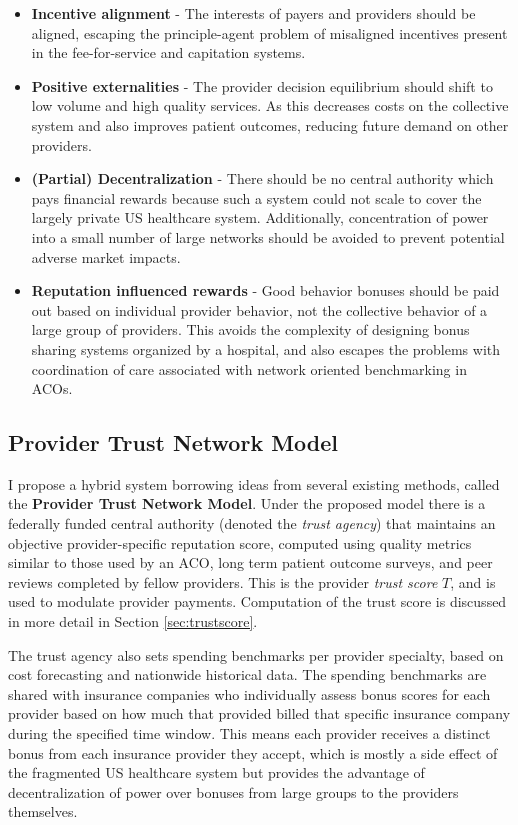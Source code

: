 \documentclass{article}
\begin{document}
\begin{itemize}
    \item \textbf{Incentive alignment} - The interests of payers and providers should be aligned, escaping the principle-agent problem of misaligned incentives present in the fee-for-service and capitation systems.
    \item \textbf{Positive externalities} - The provider decision equilibrium should shift to low volume and high quality services. As this decreases costs on the collective system and also improves patient outcomes, reducing future demand on other providers.
    \item \textbf{(Partial) Decentralization} - There should be no central authority which pays financial rewards because such a system could not scale to cover the largely private US healthcare system. Additionally, concentration of power into a small number of large networks should be avoided to prevent potential adverse market impacts.
    \item \textbf{Reputation influenced rewards} - Good behavior bonuses should be paid out based on individual provider behavior, not the collective behavior of a large group of providers. This avoids the complexity of designing bonus sharing systems organized by a hospital, and also escapes the problems with coordination of care associated with network oriented benchmarking in ACOs.
\end{itemize}

\subsection{Provider Trust Network Model} \label{sec:ptnm}
I propose a hybrid system borrowing ideas from several existing methods, called the \textbf{Provider Trust Network Model}. Under the proposed model there is a federally funded central authority (denoted the \emph{trust agency}) that maintains an objective provider-specific reputation score, computed using quality metrics similar to those used by an ACO, long term patient outcome surveys, and peer reviews completed by fellow providers. This is the provider \emph{trust score} $T$, and is used to modulate provider payments. Computation of the trust score is discussed in more detail in Section \ref{sec:trustscore}.

The trust agency also sets spending benchmarks per provider specialty, based on cost forecasting and nationwide historical data. The spending benchmarks are shared with insurance companies who individually assess bonus scores for each provider based on how much that provided billed that specific insurance company during the specified time window. This means each provider receives a distinct bonus from each insurance provider they accept, which is mostly a side effect of the fragmented US healthcare system but provides the advantage of decentralization of power over bonuses from large groups to the providers themselves.
\end{document}
